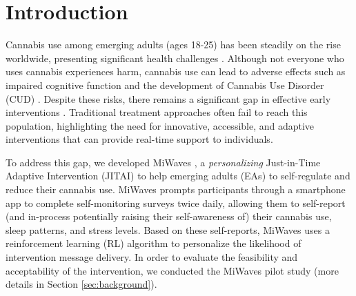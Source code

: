 \section{Introduction}



Cannabis use among emerging adults (ages 18-25) has been steadily on the rise worldwide, presenting significant health challenges \cite{unodc2023world}. 
Although not everyone who uses cannabis experiences harm, cannabis use can lead to adverse effects such as impaired cognitive function and the development of Cannabis Use Disorder (CUD) \cite{deaquino2021thc}.
Despite these risks, there remains a significant gap in effective early interventions 
\cite{stephens2021reaching}. 
Traditional treatment approaches often fail to reach this population, 
highlighting the need for innovative, accessible, and adaptive interventions that can provide real-time support to individuals.

To address this gap, we developed MiWaves \cite{coughlin2024mobile}, a \emph{personalizing} Just-in-Time Adaptive Intervention (JITAI) \cite{nahum2018jitai} to help emerging adults (EAs) to self-regulate and reduce their cannabis use. MiWaves prompts participants through a smartphone app to complete self-monitoring surveys twice daily, allowing them to self-report (and in-process potentially raising their self-awareness of) their cannabis use, sleep patterns, and stress levels. Based on these self-reports, MiWaves uses a reinforcement learning (RL) algorithm to personalize the likelihood of intervention message delivery. In order to evaluate the feasibility and acceptability of the intervention, we conducted the MiWaves pilot study (more details in Section \ref{sec:background}). 

